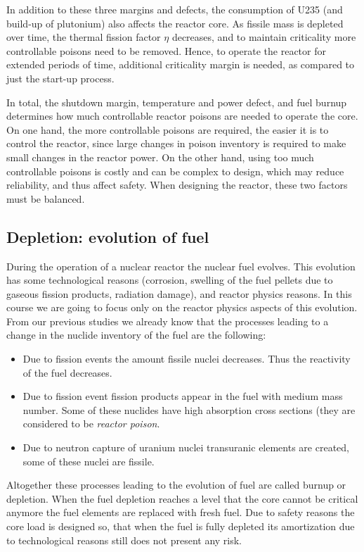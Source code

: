 In addition to these three margins and defects, the consumption of U235 (and build-up of plutonium) also affects the reactor core. As fissile mass is depleted over time, the thermal fission factor $\eta$ decreases, and to maintain criticality more controllable poisons need to be removed. Hence, to operate the reactor for extended periods of time, additional criticality margin is needed, as compared to just the start-up process.

In total, the shutdown margin, temperature and power defect, and fuel burnup determines how much controllable reactor poisons are needed to operate the core. On one hand, the more controllable poisons are required, the easier it is to control the reactor, since large changes in poison inventory is required to make small changes in the reactor power. On the other hand, using too much controllable poisons is costly and can be complex to design, which may reduce reliability, and thus affect safety. When designing the reactor, these two factors must be balanced.


\subsection{Depletion: evolution of fuel}

During the operation of a nuclear reactor the nuclear fuel evolves. This evolution has some technological reasons (corrosion, swelling of the fuel pellets due to gaseous fission products, radiation damage), and reactor physics reasons. In this course we are going to focus only on the reactor physics aspects of this evolution. From our previous studies we already know that the processes leading to a change in the nuclide inventory of the fuel are the following:

\begin{itemize}
\item Due to fission events the amount fissile nuclei decreases. Thus the reactivity of the fuel decreases.
\item Due to fission event fission products appear in the fuel with medium mass number. Some of these nuclides have high absorption cross sections (they are considered to be \textit{reactor poison}.
\item Due to neutron capture of uranium nuclei transuranic elements are created, some of these nuclei are fissile.
\end{itemize}

Altogether these processes leading to the evolution of fuel are called burnup or depletion. When the fuel depletion reaches a level that the core cannot be critical anymore the fuel elements are replaced with fresh fuel. Due to safety reasons the core load is designed so, that when the fuel is fully depleted its amortization due to technological reasons still does not present any risk.

